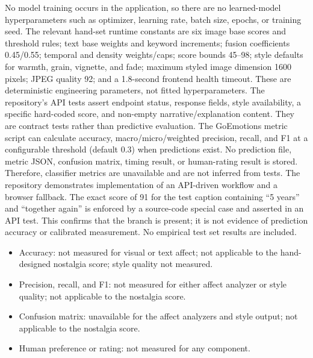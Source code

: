 \documentclass[conference]{IEEEtran}
\begin{document}
{}
\markdownRendererSectionEnd \markdownRendererSectionBegin
{}\markdownRendererInterblockSeparator
{}No model training occurs in the application, so there are no learned-model hyperparameters such as optimizer, learning rate, batch size, epochs, or training seed. The relevant hand-set runtime constants are six image base scores and threshold rules; text base weights and keyword increments; fusion coefficients 0.45/0.55; temporal and density weights/caps; score bounds 45–98; style defaults for warmth, grain, vignette, and fade; maximum styled image dimension 1600 pixels; JPEG quality 92; and a 1.8-second frontend health timeout. These are deterministic engineering parameters, not fitted hyperparameters.\markdownRendererInterblockSeparator
{}
\markdownRendererSectionEnd \markdownRendererSectionBegin
{}\markdownRendererInterblockSeparator
{}The repository’s API tests assert endpoint status, response fields, style availability, a specific hard-coded score, and non-empty narrative/explanation content. They are contract tests rather than predictive evaluation. The GoEmotions metric script can calculate accuracy, macro/micro/weighted precision, recall, and F1 at a configurable threshold (default 0.3) when predictions exist. No prediction file, metric JSON, confusion matrix, timing result, or human-rating result is stored. Therefore, classifier metrics are unavailable and are not inferred from tests.\markdownRendererInterblockSeparator
{}
\markdownRendererSectionEnd 
\markdownRendererSectionEnd \markdownRendererSectionBegin
{}\markdownRendererInterblockSeparator
{}\markdownRendererSectionBegin
{}\markdownRendererInterblockSeparator
{}The repository demonstrates implementation of an API-driven workflow and a browser fallback. The exact score of 91 for the test caption containing “5 years” and “together again” is enforced by a source-code special case and asserted in an API test. This confirms that the branch is present; it is not evidence of prediction accuracy or calibrated measurement. No empirical test set results are included.\markdownRendererInterblockSeparator
\begin{itemize}
\item Accuracy: not measured for visual or text affect; not applicable to the hand-designed nostalgia score; style quality not measured.
\item Precision, recall, and F1: not measured for either affect analyzer or style quality; not applicable to the nostalgia score.
\item Confusion matrix: unavailable for the affect analyzers and style output; not applicable to the nostalgia score.
\item Human preference or rating: not measured for any component.
\end{itemize}\par\markdownRendererInterblockSeparator
\end{document}
